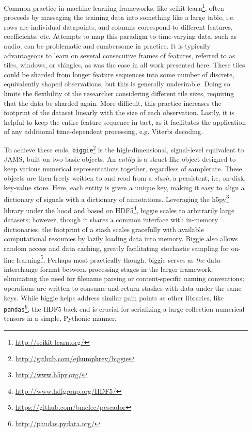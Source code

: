 Common practice in machine learning frameworks, like scikit-learn\footnote{\url{http://scikit-learn.org/}}, often proceeds by massaging the training data into something like a large table, i.e. rows are individual datapoints, and columns correspond to different features, coefficients, etc.
Attempts to map this paradigm to time-varying data, such as audio, can be problematic and cumbersome in practice.
It is typically advantageous to learn on several consecutive frames of features, referred to as tiles, windows, or shingles, as was the case in all work presented here.
These tiles could be sharded from longer feature sequences into some number of discrete, equivalently shaped observations, but this is generally undesirable.
Doing so limits the flexibility of the researcher considering different tile sizes, requiring that the data be sharded again.
More difficult, this practice increases the footprint of the dataset linearly with the size of each observation.
Lastly, it is helpful to keep the entire feature sequence in tact, as it facilitates the application of any additional time-dependent processing, e.g. Viterbi decoding.

To achieve these ends, \texttt{biggie}\footnote{\url{http://github.com/ejhumphrey/biggie}} is the high-dimensional, signal-level equivalent to JAMS, built on two basic objects.
An \emph{entity} is a struct-like object designed to keep various numerical representations together, regardless of samplerate.
These objects are then freely written to and read from a \emph{stash}, a persistent, i.e. on-disk, key-value store.
Here, each entity is given a unique key, making it easy to align a dictionary of signals with a dictionary of annotations.
Leveraging the h5py\footnote{\url{http://www.h5py.org/}} library under the hood and based on HDF5\footnote{\url{http://www.hdfgroup.org/HDF5/}}, biggie scales to arbitrarily large datasets;
however, though it shares a common interface with in-memory dictionaries, the footprint of a stash scales gracefully with available computational resources by lazily loading data into memory.
Biggie also allows random access and data caching, greatly facilitating stochastic sampling for on-line learning\footnote{\url{https://github.com/bmcfee/pescador}}.
Perhaps most practically though, biggie serves as \emph{the} data interchange format between processing stages in the larger framework, eliminating the need for filename parsing or content-specific naming conventions; operations are written to consume and return stashes with data under the same keys.
While biggie helps address similar pain points as other libraries, like \texttt{pandas}\footnote{\url{http://pandas.pydata.org/}}, the HDF5 back-end is crucial for serializing a large collection numerical tensors in a simple, Pythonic manner.



